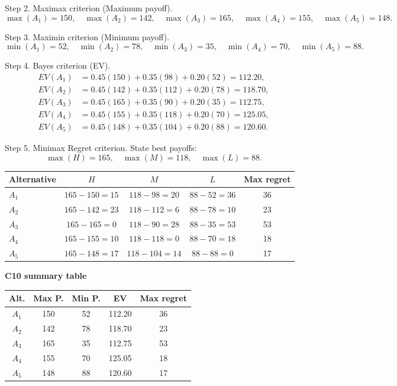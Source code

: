 \begin{ExamProblems}
		Step 2. Maximax criterion (Maximum payoff).
		\[
		\max(A_1)=150,\quad \max(A_2)=142,\quad \max(A_3)=165,\quad \max(A_4)=155,\quad \max(A_5)=148.
		\]

		Step 3. Maximin criterion (Minimum payoff).
		\[
		\min(A_1)=52,\quad \min(A_2)=78,\quad \min(A_3)=35,\quad \min(A_4)=70,\quad \min(A_5)=88.
		\]

		Step 4. Bayes criterion (EV).
		\[
		\begin{aligned}
		EV(A_1)&=0.45(150)+0.35(98)+0.20(52)=112.20,\\
		EV(A_2)&=0.45(142)+0.35(112)+0.20(78)=118.70,\\
		EV(A_3)&=0.45(165)+0.35(90)+0.20(35)=112.75,\\
		EV(A_4)&=0.45(155)+0.35(118)+0.20(70)=125.05,\\
		EV(A_5)&=0.45(148)+0.35(104)+0.20(88)=120.60.
		\end{aligned}
		\]

		Step 5. Minimax Regret criterion.
		State best payoffs:
		\[
		\max(H)=165,\quad \max(M)=118,\quad \max(L)=88.
		\]
		\begin{center}
			\begin{tabular}{l c c c c}
				\toprule
				Alternative & $H$ & $M$ & $L$ & Max regret \\
				\midrule
				$A_1$ & $165-150=15$ & $118-98=20$ & $88-52=36$ & 36 \\
				$A_2$ & $165-142=23$ & $118-112=6$ & $88-78=10$ & 23 \\
				$A_3$ & $165-165=0$ & $118-90=28$ & $88-35=53$ & 53 \\
				$A_4$ & $165-155=10$ & $118-118=0$ & $88-70=18$ & 18 \\
				$A_5$ & $165-148=17$ & $118-104=14$ & $88-88=0$ & 17 \\
				\bottomrule
			\end{tabular}
		\end{center}

		\textbf{C10 summary table}
		\begin{center}
			\begin{tabular}{c c c c c}
				\toprule
				Alt. & Max P. & Min P. & EV & Max regret \\
				\midrule
				$A_1$ & 150 & 52 & 112.20 & 36 \\
				$A_2$ & 142 & 78 & 118.70 & 23 \\
				$A_3$ & 165 & 35 & 112.75 & 53 \\
				$A_4$ & 155 & 70 & 125.05 & 18 \\
				$A_5$ & 148 & 88 & 120.60 & 17 \\
				\bottomrule
			\end{tabular}
		\end{center}


\end{ExamProblems}
